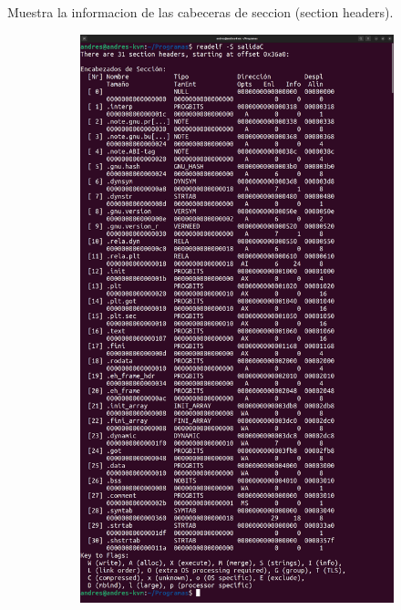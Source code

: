 \documentclass{article}
\begin{document}
\begin{itemize}
    Muestra la informacion de las cabeceras de seccion (section headers).

    \begin{figure}[H]
        \centering
        \begin{subfigure}{0.49\textwidth}
            \centering
            \includegraphics[width=\textwidth]{imagenes/C/merged.png}
        \end{subfigure}
        \hfill

\end{figure}
\end{itemize}
\end{document}
